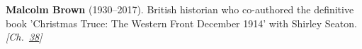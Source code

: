 \textbf{Malcolm Brown} (1930–2017). British historian who co-authored the definitive book 'Christmas Truce: The Western Front December 1914' with Shirley Seaton. \emph{[Ch.~\hyperref[ch:christmastruce1914]{38}]}


